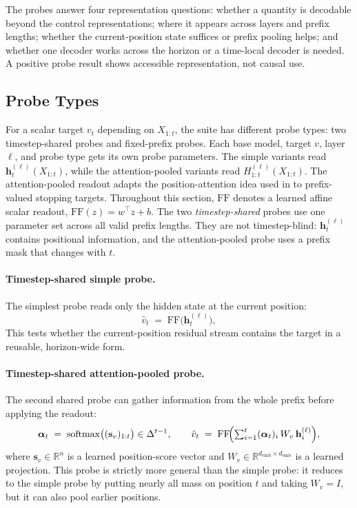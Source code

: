 \documentclass[11pt]{article}
\begin{document}
The probes answer four representation questions: whether a quantity is decodable beyond the control representations; where it appears across layers and prefix lengths; whether the current-position state suffices or prefix pooling helps; and whether one decoder works across the horizon or a time-local decoder is needed. A positive probe result shows accessible representation, not causal use.

\subsection{Probe Types}
\label{sec:probe-types}

For a scalar target $v_t$ depending on $X_{1:t}$, the suite has different probe types: two timestep-shared probes and fixed-prefix probes. Each base model, target $v$, layer $\ell$, and probe type gets its own probe parameters. The simple variants read $\mathbf{h}_t^{(\ell)}(X_{1:t})$, while the attention-pooled variants read $H_{1:t}^{(\ell)}(X_{1:t})$. The attention-pooled readout adapts the position-attention idea used in \citet{akyurekWhatLearningAlgorithm2023} to prefix-valued stopping targets.
Throughout this section, \(\mathrm{FF}\) denotes a learned affine scalar readout, \(\mathrm{FF}(z)=w^\top z+b\).
The two \emph{timestep-shared} probes use one parameter set across all valid prefix lengths. They are not timestep-blind: $\mathbf{h}_t^{(\ell)}$ contains positional information, and the attention-pooled probe uses a prefix mask that changes with $t$.

\paragraph{Timestep-shared simple probe.} The simplest probe reads only the hidden state at the current position:
\[
\hat v_t \;=\; \mathrm{FF}\bigl(\mathbf{h}_t^{(\ell)}\bigr),
\]
This tests whether the current-position residual stream contains the target in a reusable, horizon-wide form.

\paragraph{Timestep-shared attention-pooled probe.} The second shared probe can gather information from the whole prefix before applying the readout:
\[
\boldsymbol\alpha_t \;=\; \mathrm{softmax}\bigl((\mathbf{s}_v)_{1:t}\bigr) \in \Delta^{t-1}, \qquad
\hat v_t \;=\; \mathrm{FF}\!\Bigl(\textstyle\sum_{i=1}^t (\boldsymbol\alpha_t)_i \,W_v\,\mathbf{h}_i^{(\ell)}\Bigr),
\]
where $\mathbf{s}_v \in \mathbb{R}^n$ is a learned position-score vector and $W_v \in \mathbb{R}^{d_{\mathrm{emb}} \times d_{\mathrm{emb}}}$ is a learned projection. This probe is strictly more general than the simple probe: it reduces to the simple probe by putting nearly all mass on position $t$ and taking $W_v=I$, but it can also pool earlier positions.
\end{document}
